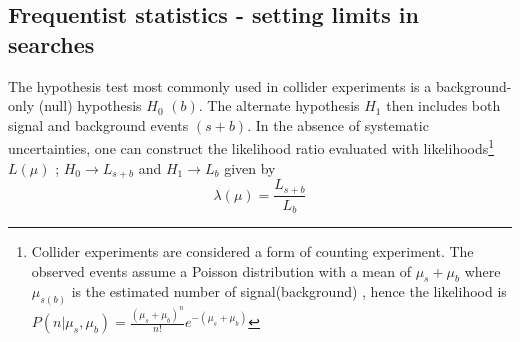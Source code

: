 \subsection{Frequentist statistics - setting limits in searches}
\label{sec:freqStat}
The hypothesis test most commonly used in collider experiments is a background-only (null) hypothesis $H_0$  $(b)$. The alternate hypothesis  $H_1$ then includes both signal and background events $(s+b)$. In the absence of systematic uncertainties, one can construct the likelihood ratio evaluated with likelihoods\footnote{Collider experiments are considered a form of counting experiment. The observed events assume a Poisson distribution with a mean of $\mu_s+\mu_b$ where $\mu_{s(b)}$ is the estimated number of signal(background) \cite{lista2017statistical, adam-bourdarios_learning_2014}, hence the likelihood is $P(n|\mu_s,\mu_b) = \frac{(\mu_s+\mu_b)^n}{n!}e^{-(\mu_s+\mu_b)}$} $L(\mu)$ \cite{LHCstats}; $H_0 \rightarrow L_{s+b}$ and $H_1 \rightarrow L_b$ given by
\begin{equation}
    \lambda(\mu) = \frac{L_{s+b}}{L_b}
    \label{eq:genLR}
\end{equation}

